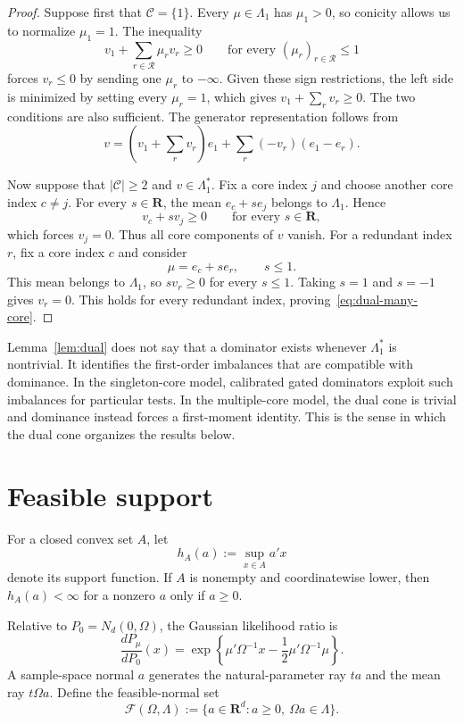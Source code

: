 \documentclass[12pt]{article}
\theoremstyle{definition}
\theoremstyle{remark}
\newcommand{\R}{\mathbf R}
\newcommand{\cC}{\mathcal C}
\newcommand{\cR}{\mathcal R}
\newcommand{\cF}{\mathcal F}
\newcommand{\1}{\mathbf 1}
\begin{document}
\begin{proof}
Suppose first that $\cC=\{1\}$.  Every $\mu\in\Lambda_1$ has
$\mu_1>0$, so conicity allows us to normalize $\mu_1=1$.  The inequality
\[
v_1+\sum_{r\in\cR}\mu_rv_r\ge0
\qquad\text{for every }(\mu_r)_{r\in\cR}\le1
\]
forces $v_r\le0$ by sending one $\mu_r$ to $-\infty$.  Given these sign
restrictions, the left side is minimized by setting every $\mu_r=1$, which
gives $v_1+\sum_rv_r\ge0$.  The two conditions are also sufficient.  The
generator representation follows from
\[
v
=
\left(v_1+\sum_rv_r\right)e_1
+\sum_r(-v_r)(e_1-e_r).
\]

Now suppose that $|\cC|\ge2$ and $v\in\Lambda_1^*$.  Fix a core index
$j$ and choose another core index $c\ne j$.  For every $s\in\R$, the mean
$e_c+se_j$ belongs to $\Lambda_1$.  Hence
\[
v_c+sv_j\ge0\qquad\text{for every }s\in\R,
\]
which forces $v_j=0$.  Thus all core components of $v$ vanish.  For a
redundant index $r$, fix a core index $c$ and consider
\[
\mu=e_c+se_r,
\qquad s\le1.
\]
This mean belongs to $\Lambda_1$, so $sv_r\ge0$ for every $s\le1$.
Taking $s=1$ and $s=-1$ gives $v_r=0$.  This holds for every redundant
index, proving~\eqref{eq:dual-many-core}.
\end{proof}

Lemma~\ref{lem:dual} does not say that a dominator exists whenever
$\Lambda_1^*$ is nontrivial.  It identifies the first-order imbalances that
are compatible with dominance.  In the singleton-core model, calibrated
gated dominators exploit such imbalances for particular tests.  In the
multiple-core model, the dual cone is trivial and dominance instead forces a
first-moment identity.  This is the sense in which the dual cone organizes
the results below.

\section{Feasible support}

For a closed convex set $A$, let
\[
h_A(a):=\sup_{x\in A}a'x
\]
denote its support function.  If $A$ is nonempty and coordinatewise lower,
then $h_A(a)<\infty$ for a nonzero $a$ only if $a\ge0$.

Relative to $P_0=N_d(0,\Omega)$, the Gaussian likelihood ratio is
\begin{equation}\label{eq:lr}
\frac{dP_\mu}{dP_0}(x)
=
\exp\left\{\mu'\Omega^{-1}x
-\frac12\mu'\Omega^{-1}\mu\right\}.
\end{equation}
A sample-space normal $a$ generates the natural-parameter ray $ta$ and the
mean ray $t\Omega a$.  Define the feasible-normal set
\begin{equation}\label{eq:feasible}
\cF(\Omega,\Lambda)
:=
\{a\in\R^d:a\ge0,\ \Omega a\in\Lambda\}.
\end{equation}
\end{document}
